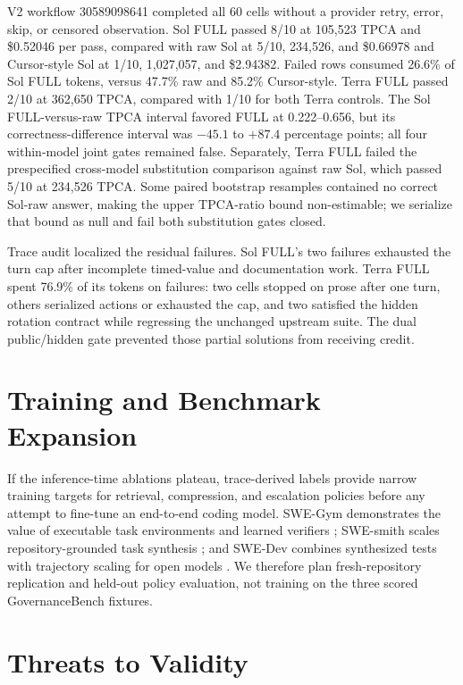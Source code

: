 \documentclass[10pt,twocolumn]{article}
\begin{document}
V2 workflow 30589098641 completed all 60 cells without a provider retry,
error, skip, or censored observation. Sol FULL passed 8/10 at 105,523 TPCA and
\$0.52046 per pass, compared with raw Sol at 5/10, 234,526, and \$0.66978 and
Cursor-style Sol at 1/10, 1,027,057, and \$2.94382. Failed rows consumed
26.6\% of Sol FULL tokens, versus 47.7\% raw and 85.2\% Cursor-style. Terra
FULL passed 2/10 at 362,650 TPCA, compared with 1/10 for both Terra controls.
The Sol FULL-versus-raw TPCA interval favored FULL at 0.222--0.656, but its
correctness-difference interval was $-45.1$ to $+87.4$ percentage points; all
four within-model joint gates remained false.
Separately, Terra FULL failed the prespecified cross-model substitution
comparison against raw Sol, which passed 5/10 at 234,526 TPCA. Some paired
bootstrap resamples contained no correct
Sol-raw answer, making the upper TPCA-ratio bound non-estimable; we serialize
that bound as null and fail both substitution gates closed.

Trace audit localized the residual failures. Sol FULL's two failures exhausted
the turn cap after incomplete timed-value and documentation work. Terra FULL
spent 76.9\% of its tokens on failures: two cells stopped on prose after one
turn, others serialized actions or exhausted the cap, and two satisfied the
hidden rotation contract while regressing the unchanged upstream suite. The
dual public/hidden gate prevented those partial solutions from receiving
credit.

\section{Training and Benchmark Expansion}

If the inference-time ablations plateau, trace-derived labels provide narrow
training targets for retrieval, compression, and escalation policies before
any attempt to fine-tune an end-to-end coding model. SWE-Gym demonstrates the
value of executable task environments and learned verifiers
\citep{pan2024swegym}; SWE-smith scales repository-grounded task synthesis
\citep{yang2025swesmith}; and SWE-Dev combines synthesized tests with
trajectory scaling for open models \citep{wang2025swedev}. We therefore plan
fresh-repository replication and held-out policy evaluation, not training on
the three scored GovernanceBench fixtures.

\section{Threats to Validity}
\end{document}
